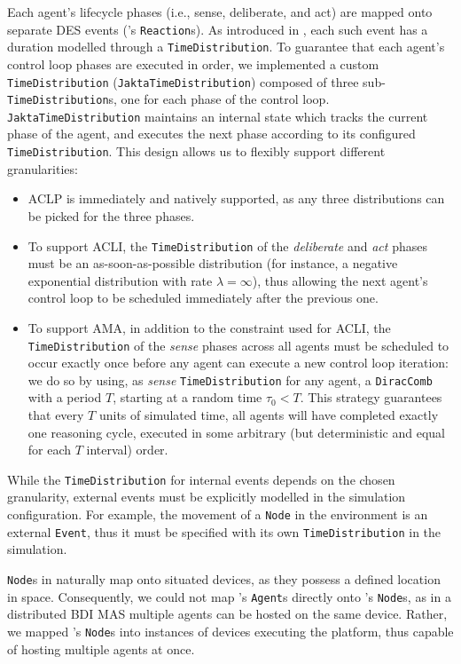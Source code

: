 Each agent's lifecycle phases (i.e., sense, deliberate, and act) are mapped
onto separate \ac{DES} events (\alchemist{}'s \texttt{Reaction}s).
%
As introduced in ,
each such event has a duration modelled through a \texttt{TimeDistribution}.
%
To guarantee that each agent's control loop phases are executed in order,
we implemented a custom \texttt{TimeDistribution}
(\texttt{JaktaTimeDistribution})
composed of three sub-\texttt{TimeDistribution}s,
one for each phase of the control loop.
%
\texttt{JaktaTimeDistribution} maintains an internal state
which tracks the current phase of the agent,
and executes the next phase according to its configured \texttt{TimeDistribution}.
%
This design allows us to flexibly support different granularities:
\begin{itemize}
    \item \ac{ACLP} is immediately and natively supported,
    as any three distributions can be picked for the three phases.
    \item To support \ac{ACLI},
    the \texttt{TimeDistribution} of the \emph{deliberate} and \emph{act} phases
    must be an as-soon-as-possible distribution
    (for instance, a negative exponential distribution with rate $\lambda=\infty$),
    thus allowing the next agent's control loop to be scheduled immediately after the previous one.
    \item To support \ac{AMA},
    in addition to the constraint used for \ac{ACLI},
    the \texttt{TimeDistribution} of the \emph{sense} phases across all agents
    must be scheduled to occur exactly once
    before any agent can execute a new control loop iteration:
    we do so by using, as \emph{sense} \texttt{TimeDistribution} for any agent,
    a \texttt{DiracComb} with a period $T$,
    starting at a random time $\tau_0 < T$.
    This strategy guarantees that every $T$ units of simulated time,
    all agents will have completed exactly one reasoning cycle,
    executed in some arbitrary (but deterministic and equal for each $T$ interval) order.
\end{itemize}

While the \texttt{TimeDistribution} for internal events depends on the chosen granularity,
external events must be explicitly modelled in the simulation configuration.
%
For example,
the movement of a \texttt{Node} in the environment is an external \texttt{Event},
thus it must be specified with its own \texttt{TimeDistribution} in the simulation.

\texttt{Node}s in \alchemist{} naturally map onto situated devices,
as they possess a defined location in space.
%
Consequently,
we could not map \jakta{}'s \texttt{Agent}s directly onto \alchemist{}'s \texttt{Node}s,
as in a distributed \ac{BDI} \ac{MAS} multiple agents can be hosted on the same device.
%
Rather,
we mapped \alchemist{}'s \texttt{Node}s into instances of devices executing the \jakta{} platform,
thus capable of hosting multiple agents at once.

